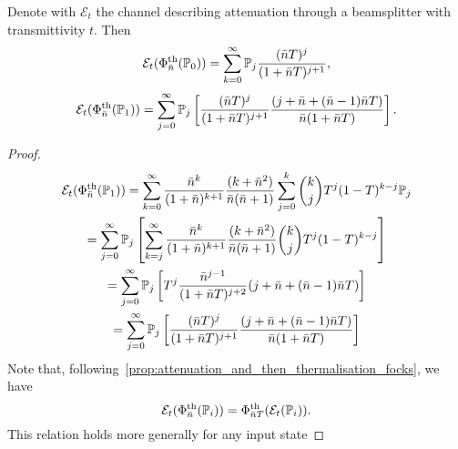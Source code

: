 \documentclass[12pt]{report}
\newcommand{\PP}{\mathbb{P}}
\newcommand{\calE}{{\mathcal{E}}}
\begin{document}
\begin{prop}
	Denote with $\calE_t$ the channel describing attenuation through a beamsplitter with transmittivity $t$. Then
	\begin{equation}
		\calE_t(\Phi_{\bar n}^{\rm th}(\PP_0))
		= \sum_{k=0}^\infty \PP_j
		\frac{(\bar n T)^j}{(1+\bar n T)^{j+1}},
	\end{equation}
	\begin{equation}
		\calE_t(\Phi_{\bar n}^{\rm th}(\PP_1))
		= \sum_{j=0}^\infty \PP_j \left[
		\frac{(\bar n T)^j}{(1+\bar n T)^{j+1}}
		\frac{(j + \bar n + (\bar n-1)\bar nT)}{\bar n(1+\bar nT)}
		\right].
	\end{equation}
\end{prop}
\begin{proof}
	\begin{equation}
	\begin{gathered}
		\calE_t(\Phi_{\bar n}^{\rm th}(\PP_1))
		= \sum_{k=0}^\infty
		\frac{\bar n^k}{(1+\bar n)^{k+1}}
		\frac{(k+\bar n^2)}{\bar n(\bar n+1)}
		\sum_{j=0}^k
		\binom{k}{j} T^j (1-T)^{k-j} \PP_j \\
		= \sum_{j=0}^\infty \PP_j
		\left[
		\sum_{k=j}^\infty 
		\frac{\bar n^k}{(1+\bar n)^{k+1}}
		\frac{(k+\bar n^2)}{\bar n(\bar n+1)}
		\binom{k}{j} T^j (1-T)^{k-j}
		\right] \\
		= \sum_{j=0}^\infty \PP_j \left[
		T^j \frac{\bar n^{j-1}}{(1+\bar n T)^{j+2}}
		(j + \bar n + (\bar n-1)\bar nT)
		\right] \\
		= \sum_{j=0}^\infty \PP_j \left[
		\frac{(\bar n T)^j}{(1+\bar n T)^{j+1}}
		\frac{(j + \bar n + (\bar n-1)\bar nT)}{\bar n(1+\bar nT)}
		\right]
	\end{gathered}
	\end{equation}
	Note that, following~\cref{prop:attenuation_and_then_thermalisation_focks}, we have
	\begin{equation}
		\calE_t(\Phi_{\bar n}^{\rm th}(\PP_i))
		= \Phi^{\rm th}_{\bar nT}(\calE_t(\PP_i)).
	\end{equation}
	This relation holds more generally for any input state 
\end{proof}
\end{document}
